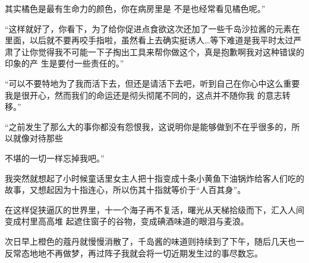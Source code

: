 \documentclass{article}
\begin{document}
其实橘色是最有生命力的颜色，你在病房里是
不是也经常看见橘色呢。” 

“这样就好了，你看下，为了给你促进点食欲这次还加了一些千岛沙拉酱的元素在里面，以后就不要再咬手指啦，虽然看上去确实挺诱人…等下难道是我平时太过严肃了让你觉得我不可能一下子掏出工具来帮你做这个，真是抱歉啊我对这种错误的印象的产
生是要付一些责任的。” 

“可以不要特地为了我而活下去，但还是请活下去吧，听到自己在你心中这么重要我是很开心，然而我们的命运还是彻头彻尾不同的，这点并不随你我
的意志转移。”  

“之前发生了那么大的事你都没有怨恨我，这说明你是能够做到不在乎很多的，所以就像对待那些
\newpage

不堪的一切一样忘掉我吧。” 

我突然就想起了小时候童话里女主人把十指变成十条小黄鱼下油锅炸给客人们吃的故事，又想起因为十指连心，所以伤其十指就等价于“人百其身”。
  

在这样促狭逼仄的世界里，十一个海子再不复活，曙光从天梯拾级而下，汇入人间变成村里高高堆
起遮住窗子的谷物，变成碘酒味道的眼泪与麦浪。 

次日早上橙色的蔻丹就慢慢消散了，千岛酱的味道则持续到了下午，随后几天也一反常态地地不再做梦，再过阵子我就会将一切近期发生过的事尽数忘。
\end{document}
